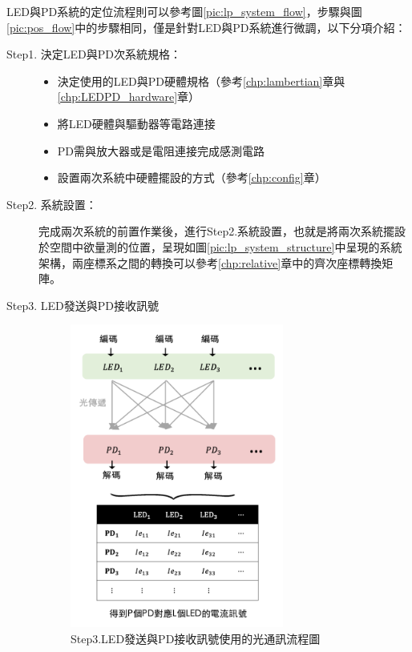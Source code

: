 LED與PD系統的定位流程則可以參考圖\ref{pic:lp_system_flow}，步驟與圖\ref{pic:pos_flow}中的步驟相同，僅是針對LED與PD系統進行微調，以下分項介紹：
    

\begin{description}
    \item[Step1. 決定LED與PD次系統規格：]
    
    \hfill
    
        \begin{itemize}
            \item 決定使用的LED與PD硬體規格（參考\ref{chp:lambertian}章與\ref{chp:LEDPD_hardware}章）
            \item 將LED硬體與驅動器等電路連接
            \item PD需與放大器或是電阻連接完成感測電路  
            \item 設置兩次系統中硬體擺設的方式（參考\ref{chp:config}章）
        \end{itemize}

    \item[Step2. 系統設置：] 
    
    \hfill
    
    \qquad 
    完成兩次系統的前置作業後，進行Step2.系統設置，也就是將兩次系統擺設於空間中欲量測的位置，呈現如圖\ref{pic:lp_system_structure}中呈現的系統架構，兩座標系之間的轉換可以參考\ref{chp:relative}章中的齊次座標轉換矩陣。

    \item[Step3. LED發送與PD接收訊號]\hfill
    
    \begin{figure}[htpb]
        \centering
        \includegraphics[width=7cm]{ch2pic/vlc_flow_draw.png}
        \caption{Step3.LED發送與PD接收訊號使用的光通訊流程圖}
        \label{pic:vlc_flow_draw}
    \end{figure}


\end{description}
